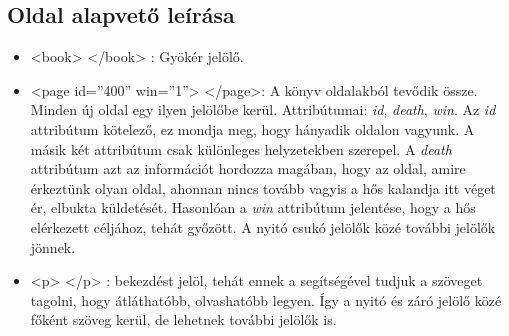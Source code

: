 \documentclass[12pt,a4paper,oneside]{report}
\newcommand{\xtag}[1]{{\color{Tag}#1}}
\newcommand{\xattr}[2]{{\color{Attr}#1}={\color{Value}''#2''}}
\newcommand{\attr}{\emph}
\begin{document}
    \subsection{Oldal alapvető leírása}
      \begin{itemize}
        \item <\xtag{book}> <\xtag{/book}> : Gyökér jelölő.

        \item <\xtag{page} \xattr{id}{400} \xattr{win}{1}>
          <\xtag{/page}>: A könyv oldalakból tevődik
          össze. Minden új oldal egy ilyen jelölőbe
          kerül. Attribútumai: \attr{id}, \attr{death}, \attr{win}.
          Az \attr{id} attribútum kötelező, ez mondja meg, hogy
          hányadik oldalon vagyunk. A másik két attribútum csak
          különleges helyzetekben szerepel. A \attr{death} attribútum
          azt az információt hordozza magában, hogy az oldal, amire
          érkeztünk olyan oldal, ahonnan nincs tovább vagyis a hős
          kalandja itt véget ér, elbukta küldetését. Hasonlóan a
          \attr{win} attribútum jelentése, hogy a hős elérkezett
          céljához, tehát győzött. A nyitó csukó jelölők közé további
          jelölők jönnek.
          
        \item <\xtag{p}> <\xtag{/p}> : bekezdést jelöl, tehát ennek a
          segítségével tudjuk a szöveget tagolni, hogy átláthatóbb,
          olvashatóbb legyen. Így a nyitó és záró jelölő közé főként
          szöveg kerül, de lehetnek további jelölők is.
      \end{itemize}
      
\end{document}
